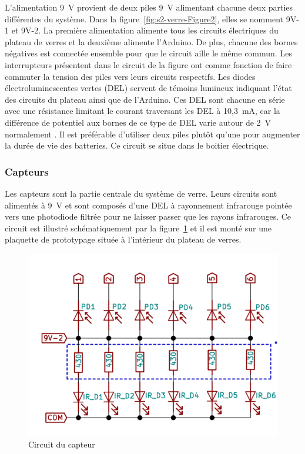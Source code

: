 L’alimentation 9~V provient de deux piles 9~V alimentant chacune deux parties différentes du système.
Dans la figure~\ref{fig:s2-verre-Figure2}, elles se nomment 9V-1 et 9V-2.
La première alimentation alimente tous les circuits électriques du plateau de verres et la deuxième alimente l’Arduino.
De plus, chacune des bornes négatives est connectée ensemble pour que le circuit aille le même commun.
Les interrupteurs présentent dans le circuit de la figure ont comme fonction de faire commuter la tension des piles vers leurs circuits respectifs.
Les diodes électroluminescentes vertes (DEL) servent de témoins lumineux indiquant l’état des circuits du plateau ainsi que de l’Arduino.
Ces DEL sont chacune en série avec une résistance limitant le courant traversant les DEL à 10,3~mA, car la différence de potentiel aux bornes de ce type de DEL varie autour de 2~V normalement \cite{nte_electronics_inc_nte3131_2008}.
Il est préférable d’utiliser deux piles plutôt qu’une pour augmenter la durée de vie des batteries.
Ce circuit se situe dans le boitier électrique.

\subsubsection{Capteurs}

Les capteurs sont la partie centrale du système de verre.
Leurs circuits sont alimentés à 9~V et sont composés d’une DEL à rayonnement infrarouge pointée vers une photodiode filtrée pour ne laisser passer que les rayons infrarouges.
Ce circuit est illustré schématiquement par la figure~\ref{fig:s2-verre-Figure4} et il est monté sur une plaquette de prototypage située à l’intérieur du plateau de verres.

\begin{figure}[h!]
    \centering
    \includegraphics[width=0.4\linewidth]{img/s2/verre/Figure4}
    \caption{Circuit du capteur}
    \label{fig:s2-verre-Figure4}
\end{figure}

